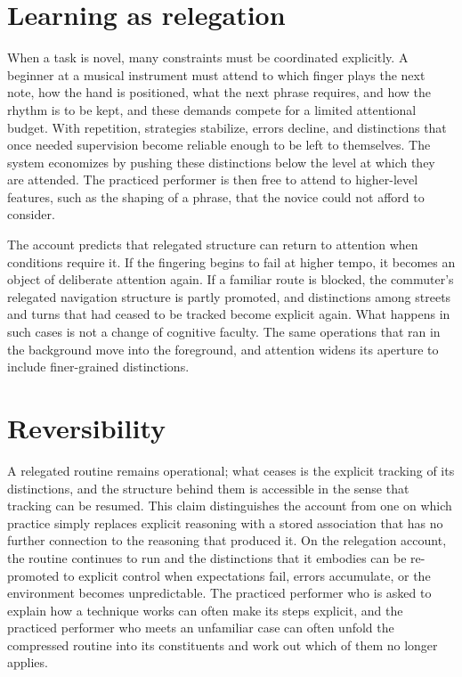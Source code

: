 \documentclass[11pt]{report}
\theoremstyle{remark}
\theoremstyle{definition}
\begin{document}
\section{Learning as relegation}

When a task is novel, many constraints must be coordinated explicitly. A beginner at a musical instrument must attend to which finger plays the next note, how the hand is positioned, what the next phrase requires, and how the rhythm is to be kept, and these demands compete for a limited attentional budget. With repetition, strategies stabilize, errors decline, and distinctions that once needed supervision become reliable enough to be left to themselves. The system economizes by pushing these distinctions below the level at which they are attended. The practiced performer is then free to attend to higher-level features, such as the shaping of a phrase, that the novice could not afford to consider.

The account predicts that relegated structure can return to attention when conditions require it. If the fingering begins to fail at higher tempo, it becomes an object of deliberate attention again. If a familiar route is blocked, the commuter's relegated navigation structure is partly promoted, and distinctions among streets and turns that had ceased to be tracked become explicit again. What happens in such cases is not a change of cognitive faculty. The same operations that ran in the background move into the foreground, and attention widens its aperture to include finer-grained distinctions.

\section{Reversibility}

A relegated routine remains operational; what ceases is the explicit tracking of its distinctions, and the structure behind them is accessible in the sense that tracking can be resumed. This claim distinguishes the account from one on which practice simply replaces explicit reasoning with a stored association that has no further connection to the reasoning that produced it. On the relegation account, the routine continues to run and the distinctions that it embodies can be re-promoted to explicit control when expectations fail, errors accumulate, or the environment becomes unpredictable. The practiced performer who is asked to explain how a technique works can often make its steps explicit, and the practiced performer who meets an unfamiliar case can often unfold the compressed routine into its constituents and work out which of them no longer applies.
\end{document}
